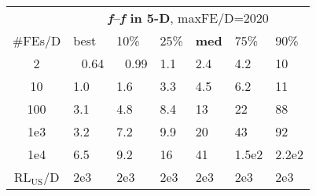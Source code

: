 \begin{tabular}{c|llllll}
 & \multicolumn{6}{|c}{\textbf{\textit{f}\raisebox{-0.35ex}{1}--\textit{f}\raisebox{-0.35ex}{24} in 5-D}, maxFE/D=2020}\\
\#FEs/D & best & 10\% & 25\% & \textbf{med} & 75\% & 90\%\\
2 & ~\,0.64 & ~\,0.99 & \hspace*{1ex}1.1 & \hspace*{1ex}2.4 & \hspace*{1ex}4.2 & 10\\
10 & \hspace*{1ex}1.0 & \hspace*{1ex}1.6 & \hspace*{1ex}3.3 & \hspace*{1ex}4.5 & \hspace*{1ex}6.2 & 11\\
100 & \hspace*{1ex}3.1 & \hspace*{1ex}4.8 & \hspace*{1ex}8.4 & 13 & 22 & 88\\
1e3 & \hspace*{1ex}3.2 & \hspace*{1ex}7.2 & \hspace*{1ex}9.9 & 20 & 43 & 92\\
1e4 & \hspace*{1ex}6.5 & \hspace*{1ex}9.2 & 16 & 41 & 1.5e2 & 2.2e2\\
$\text{RL}_{\text{US}}$/D & 2e3 & 2e3 & 2e3 & 2e3 & 2e3 & 2e3
\end{tabular}
